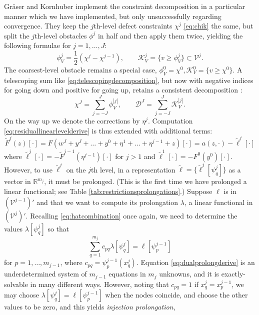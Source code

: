 \documentclass[letterpaper,final,12pt,reqno]{amsart}
\theoremstyle{claim}
\newcommand{\RR}{\mathbb{R}}
\numberwithin{equation}{section}
\numberwithin{figure}{section}
\numberwithin{table}{section}
\numberwithin{theorem}{section}
\begin{document}
Gr\"aser and Kornhuber \cite{GraeserKornhuber2009} implement the constraint decomposition in a particular manner which we have implemented, but only unsuccessfully regarding convergence.  They keep the $j$th-level defect constraints $\chi^j$ \eqref{eq:chik} the same, but split the $j$th-level obstacles $\phi^j$ in half and then apply them twice, yielding the following formulae for $j=1,\dots,J$:
\begin{equation}
\phi_V^j = \frac{1}{2}(\chi^j-\chi^{j-1}), \qquad \mathcal{K}_V^j = \{v \ge \phi_V^j\} \subset \mathcal{V}^j.
\end{equation}
The coarsest-level obstacle remains a special case, $\phi_V^0 = \chi^0,\mathcal{K}_V^0 = \{v \ge \chi^0\}$.  A telescoping sum like \eqref{eq:telescopingdecomposition}, but now with negative indices for going down and positive for going up, retains a consistent decomposition \cite{GraeserKornhuber2009,Tai2003}:
\begin{equation}
\chi^J = \sum_{j=-J}^J \phi_V^{|j|}, \qquad \mathcal{D}^J = \sum_{j=-J}^J \mathcal{K}_V^{|j|}.
\end{equation}
On the way up we denote the corrections by $\eta^j$.  Computation \eqref{eq:residuallinearlevelderive} is thus extended with additional terms:
\begin{equation}
  \tilde F^j(z)[\cdot] = F(w^J + y^J + \dots + y^0 + \eta^1 + \dots + \eta^{j-1} + z)[\cdot] = a(z,\cdot) - \tilde \ell^j[\cdot] \label{eq:residuallinearlevelv}
\end{equation}
where $\tilde\ell^j[\cdot] = - \tilde F^{j-1}(\eta^{j-1})[\cdot]$ for $j>1$ and $\tilde\ell^1[\cdot] = - F^0(y^0)[\cdot]$.  However, to use $\tilde\ell^j$ on the $j$th level, in a representation $\tilde{\bm{\ell}} = \{\tilde\ell^j[\psi_q^j]\}$ as a vector in $\RR^{m_j}$, it must be prolonged.  (This is the first time we have prolonged a linear functional; see Table \ref{tab:restrictionsprolongations}.)  Suppose $\ell$ is in $(\mathcal{V}^{j-1})'$ and that we want to compute its prolongation $\lambda$, a linear functional in $(\mathcal{V}^j)'$.  Recalling \eqref{eq:hatcombination} once again, we need to determine the values $\lambda[\psi_q^j]$ so that
\begin{equation}
  \sum_{q=1}^{m_j} c_{pq} \lambda[\psi_q^j] = \ell[\psi_p^{j-1}] \label{eq:dualprolongderive}
\end{equation}
for $p=1,\dots,m_{j-1}$, where $c_{pq} = \psi_p^{j-1}(x_q^j)$.  Equation \eqref{eq:dualprolongderive} is an underdetermined system of $m_{j-1}$ equations in $m_j$ unknowns, and it is exactly-solvable in many different ways.  However, noting that $c_{pq}=1$ if $x_q^j=x_p^{j-1}$, we may choose $\lambda[\psi_q^j] = \ell[\psi_p^{j-1}]$ when the nodes coincide, and choose the other values to be zero, and this yields \emph{injection prolongation},
\end{document}
